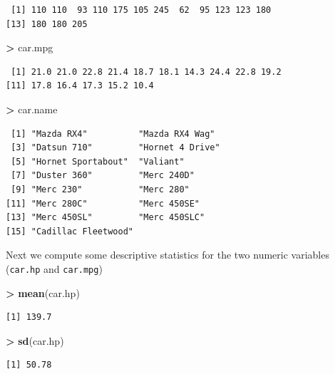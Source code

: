 \documentclass[]{krantz}
\makeatletter
\newenvironment{Shaded}{\begin{snugshade}}{\end{snugshade}}
\newcommand{\KeywordTok}[1]{\textcolor[rgb]{0.27,0.27,0.27}{\textbf{#1}}}
\newcommand{\NormalTok}[1]{#1}
\newcommand{\OperatorTok}[1]{\textcolor[rgb]{0.43,0.43,0.43}{\textbf{#1}}}
\newcommand{\StringTok}[1]{\textcolor[rgb]{0.5,0.5,0.5}{#1}}
\newenvironment{kframe}{%
\medskip{}
\setlength{\fboxsep}{.8em}
 \def\at@end@of@kframe{}%
 \ifinner\ifhmode%
  \def\at@end@of@kframe{\end{minipage}}%
  \begin{minipage}{\columnwidth}%
 \fi\fi%
 \def\FrameCommand##1{\hskip\@totalleftmargin \hskip-\fboxsep
 \colorbox{shadecolor}{##1}\hskip-\fboxsep
     \hskip-\linewidth \hskip-\@totalleftmargin \hskip\columnwidth}%
 \MakeFramed {\advance\hsize-\width
   \@totalleftmargin\z@ \linewidth\hsize
   \@setminipage}}%
 {\par\unskip\endMakeFramed%
 \at@end@of@kframe}
\renewenvironment{Shaded}{\begin{kframe}}{\end{kframe}}
\makeatother
\begin{document}
\begin{verbatim}
 [1] 110 110  93 110 175 105 245  62  95 123 123 180
[13] 180 180 205
\end{verbatim}

\begin{Shaded}
\begin{Highlighting}[]
\OperatorTok{>}\StringTok{ }\NormalTok{car.mpg}
\end{Highlighting}
\end{Shaded}

\begin{verbatim}
 [1] 21.0 21.0 22.8 21.4 18.7 18.1 14.3 24.4 22.8 19.2
[11] 17.8 16.4 17.3 15.2 10.4
\end{verbatim}

\begin{Shaded}
\begin{Highlighting}[]
\OperatorTok{>}\StringTok{ }\NormalTok{car.name}
\end{Highlighting}
\end{Shaded}

\begin{verbatim}
 [1] "Mazda RX4"          "Mazda RX4 Wag"     
 [3] "Datsun 710"         "Hornet 4 Drive"    
 [5] "Hornet Sportabout"  "Valiant"           
 [7] "Duster 360"         "Merc 240D"         
 [9] "Merc 230"           "Merc 280"          
[11] "Merc 280C"          "Merc 450SE"        
[13] "Merc 450SL"         "Merc 450SLC"       
[15] "Cadillac Fleetwood"
\end{verbatim}

Next we compute some descriptive statistics for the two numeric variables (\texttt{car.hp} and \texttt{car.mpg})

\begin{Shaded}
\begin{Highlighting}[]
\OperatorTok{>}\StringTok{ }\KeywordTok{mean}\NormalTok{(car.hp)}
\end{Highlighting}
\end{Shaded}

\begin{verbatim}
[1] 139.7
\end{verbatim}

\begin{Shaded}
\begin{Highlighting}[]
\OperatorTok{>}\StringTok{ }\KeywordTok{sd}\NormalTok{(car.hp)}
\end{Highlighting}
\end{Shaded}

\begin{verbatim}
[1] 50.78
\end{verbatim}
\end{document}
